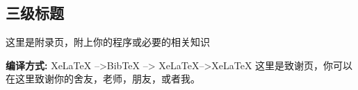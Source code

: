\documentclass{LZUthesis}
\begin{document}
\subsection{三级标题}


\backmatter


\printbib




\Appendix


这里是附录页，附上你的程序或必要的相关知识\cite{partl2016}

{\bfseries 编译方式:} XeLaTeX -->BibTeX --> XeLaTeX-->XeLaTeX
\Thanks
这里是致谢页，你可以在这里致谢你的舍友，老师，朋友，或者我。





\Grade
\end{document}
